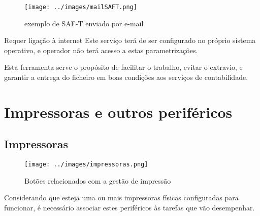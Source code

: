 \documentclass[a4paper,11pt,openany]{memoir}
\begin{document}
\begin{figure}
\begin{center}
\texttt{[image: ../images/mailSAFT.png]}
\caption[Submanifold]{exemplo de SAF-T enviado por e-mail}
\label{relatorioOficial}
\end{center}
\end{figure}

\begin{bclogo}[couleur=blue!10,arrondi=0.1,logo=\bctakecare,ombre=true]{Requer ligação à internet}
Este serviço terá de ser configurado no próprio sistema operativo, e operador não terá acesso 
a estas parametrizações.
 
Esta ferramenta serve o propósito de facilitar o trabalho, evitar o extravio, e garantir a entrega do ficheiro em boas condições aos serviços de contabilidade.
\end{bclogo}










\chapter{Impressoras e outros periféricos}






\section{Impressoras}

\begin{figure}[h]
\begin{center}
\texttt{[image: ../images/impressoras.png]}
\caption[Submanifold]{Botões relacionados com a gestão de impressão}
\label{impressoras}
\end{center}
\end{figure}


Considerando que esteja uma ou mais impressoras físicas configuradas para funcionar, é necessário associar estes
periféricos às tarefas que vão desempenhar.



\end{document}
